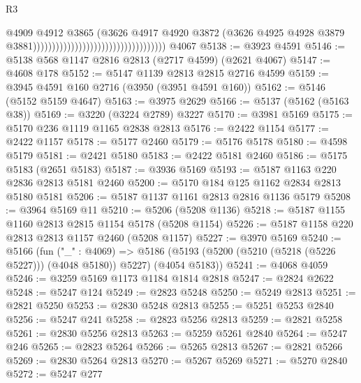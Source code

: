 \begin{lexlean}{R3}
\begin{coremodule}
                                                                      @4909
                                                                      @4912
                                                                      @3865
                                                                      (@3626
                                                                        @4917
                                                                        @4920
                                                                        @3872
                                                                        (@3626
                                                                          @4925
                                                                          @4928
                                                                          @3879
                                                                          @3881)))))))))))))))))))))))))))))))))))
    @4067
@5138 := @3923 @4591
@5146 := @5138 @568 @1147 @2816 @2813 (@2717 @4599) (@2621 @4067)
@5147 := @4608 @178
@5152 := @5147 @1139 @2813 @2815 @2716 @4599
@5159 := @3945 @4591 @160 @2716 (@3950 (@3951 @4591 @160))
@5162 := @5146 (@5152 @5159 @4647)
@5163 := @3975 @2629
@5166 := @5137 (@5162 (@5163 @38))
@5169 := @3220 (@3224 @2789) @3227
@5170 := @3981 @5169
@5175 := @5170 @236 @1119 @1165 @2838 @2813
@5176 := @2422 @1154
@5177 := @2422 @1157
@5178 := @5177 @2460
@5179 := @5176 @5178
@5180 := @4598 @5179
@5181 := @2421 @5180
@5183 := @2422 @5181 @2460
@5186 := @5175 @5183 (@2651 @5183)
@5187 := @3936 @5169
@5193 := @5187 @1163 @220 @2836 @2813 @5181 @2460
@5200 := @5170 @184 @125 @1162 @2834 @2813 @5180 @5181
@5206 := @5187 @1137 @1161 @2813 @2816 @1136 @5179
@5208 := @3964 @5169 @11
@5210 := @5206 (@5208 @1136)
@5218 := @5187 @1155 @1160 @2813 @2815 @1154 @5178 (@5208 @1154)
@5226 := @5187 @1158 @220 @2813 @2813 @1157 @2460 (@5208 @1157)
@5227 := @3970 @5169
@5240 := @5166
    (fun ("_" : @4069) =>
    @5186 (@5193 (@5200 (@5210 (@5218 (@5226 @5227))) (@4048 @5180)) @5227) (@4054 @5183))
@5241 := @4068 @4059
@5246 := @3259 @5169 @1173 @1184 @1814 @2818
@5247 := @2824 @2622
@5248 := @5247 @124
@5249 := @2823 @5248
@5250 := @5249 @2813
@5251 := @2821 @5250
@5253 := @2830 @5248 @2813
@5255 := @5251 @5253 @2840
@5256 := @5247 @241
@5258 := @2823 @5256 @2813
@5259 := @2821 @5258
@5261 := @2830 @5256 @2813
@5263 := @5259 @5261 @2840
@5264 := @5247 @246
@5265 := @2823 @5264
@5266 := @5265 @2813
@5267 := @2821 @5266
@5269 := @2830 @5264 @2813
@5270 := @5267 @5269
@5271 := @5270 @2840
@5272 := @5247 @277

\end{coremodule}
\end{lexlean}
